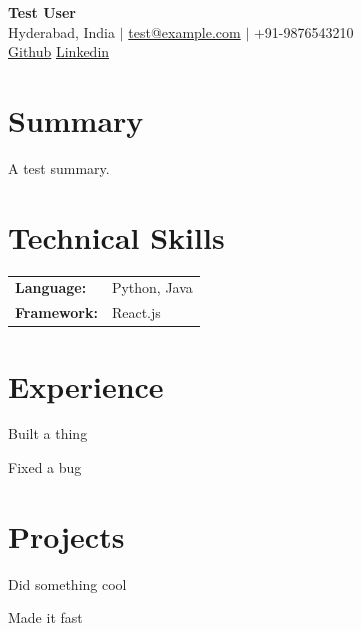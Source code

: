 \documentclass{careeros}
\begin{document}
\begin{center}
  {\Huge \textbf{Test User}}\\[4pt]
  \small
  Hyderabad, India \quad $|$ \quad
  \href{mailto:test@example.com}{test@example.com} \quad $|$ \quad
  +91-9876543210
  \\[3pt]
  \href{https://github.com/test}{Github}\quad
  \href{https://linkedin.com/in/test}{Linkedin}\quad
\end{center}
\vspace{-4pt}

\section{Summary}
A test summary.
\vspace{2pt}

\section{Technical Skills}
\begin{tabular*}{\textwidth}{@{}l@{\quad}l@{}}
  \textbf{Language:} & Python, Java \\
  \textbf{Framework:} & React.js \\
\end{tabular*}
\vspace{2pt}

\section{Experience}
\begin{bulletlist}
  \item Built a thing
  \item Fixed a bug
\end{bulletlist}

\section{Projects}
\begin{bulletlist}
  \item Did something cool
  \item Made it fast
\end{bulletlist}
\end{document}
